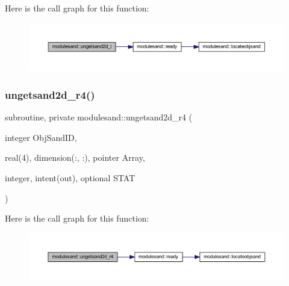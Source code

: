 Here is the call graph for this function\+:\nopagebreak
\begin{figure}[H]
\begin{center}
\leavevmode
\includegraphics[width=350pt]{namespacemodulesand_a4daaa1c74789b3c8e2b813c33c5dd7f4_cgraph}
\end{center}
\end{figure}
\mbox{\label{namespacemodulesand_aebab0f132145eea11b487947d2b9b3f1}} 
\subsubsection{\texorpdfstring{ungetsand2d\+\_\+r4()}{ungetsand2d\_r4()}}
{\footnotesize\ttfamily subroutine, private modulesand\+::ungetsand2d\+\_\+r4 (\begin{DoxyParamCaption}\item[{integer}]{Obj\+Sand\+ID,  }\item[{real(4), dimension(\+:, \+:), pointer}]{Array,  }\item[{integer, intent(out), optional}]{S\+T\+AT }\end{DoxyParamCaption})\hspace{0.3cm}{\ttfamily [private]}}

Here is the call graph for this function\+:\nopagebreak
\begin{figure}[H]
\begin{center}
\leavevmode
\includegraphics[width=350pt]{namespacemodulesand_aebab0f132145eea11b487947d2b9b3f1_cgraph}
\end{center}
\end{figure}
\mbox{\label{namespacemodulesand_ab4572edb29539b65dc7c75cb29005448}} 
